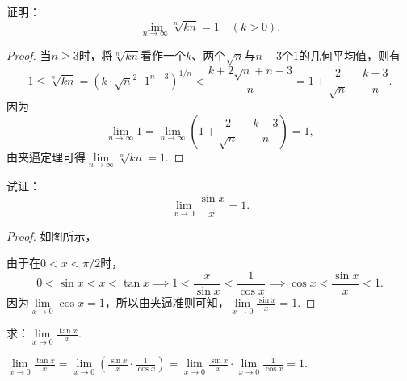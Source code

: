 \begin{example}
证明：\begin{equation}
	\lim\limits_{n\to\infty} \sqrt[n]{k n} = 1
	\quad(k>0).
\end{equation}
\begin{proof}
当\(n \geq 3\)时，将\(\sqrt[n]{k n}\)看作一个\(k\)、两个\(\sqrt{n}\)与\(n-3\)个\(1\)的几何平均值，则有\[
1 \leq \sqrt[n]{k n} = (k \cdot \sqrt{n}^2 \cdot 1^{n-3})^{1/n}
< \frac{k + 2\sqrt{n} + n-3}{n}
= 1 + \frac{2}{\sqrt{n}} + \frac{k-3}{n}.
\]因为\[
\lim\limits_{n\to\infty} 1
= \lim\limits_{n\to\infty} \left(1 + \frac{2}{\sqrt{n}} + \frac{k-3}{n}\right) = 1,
\]由夹逼定理可得\(\lim\limits_{n\to\infty} \sqrt[n]{k n} = 1\).
\end{proof}
\end{example}

\begin{example}[重要极限I]
试证：\begin{equation}\label{equation:极限.重要极限I}
\lim\limits_{x\to0} \frac{\sin x}{x} = 1.
\end{equation}
\begin{proof}
如图所示，
\begin{center}
\end{center}
由于在\(0 < x < \pi/2\)时，\[
0 < \sin x < x < \tan x
\implies
1 < \frac{x}{\sin x} < \frac{1}{\cos x}
\implies
\cos x < \frac{\sin x}{x} < 1.
\]
因为\(\lim\limits_{x\to0}\cos x = 1\)，所以由\hyperref[theorem:极限.夹逼准则]{夹逼准则}可知，\(\lim\limits_{x\to0} \frac{\sin x}{x} = 1\).
\end{proof}
\end{example}

\begin{example}
\def\l{\lim\limits_{x\to0}}
求：\(\l \frac{\tan x}{x}\).
\begin{solution}
\(
\l \frac{\tan x}{x}
= \l \left(\frac{\sin x}{x} \cdot \frac{1}{\cos x}\right)
= \l \frac{\sin x}{x} \cdot \lim\limits_{x\to0}\frac{1}{\cos x}
= 1.
\)
\end{solution}
\end{example}


